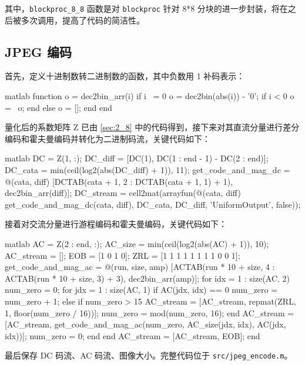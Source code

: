 \documentclass[a4paper]{article}  %
\begin{document}
其中，\texttt{blockproc\_8\_8} 函数是对 \texttt{blockproc} 针对 8*8 分块的进一步封装，将在之后被多次调用，提高了代码的简洁性。

\subsection{JPEG 编码}

首先，定义十进制数转二进制数的函数，其中负数用 1 补码表示：

\begin{codeblock}{matlab}
function o = dec2bin_arr(i)
    if i ~= 0
        o = dec2bin(abs(i)) - '0';
        if i < 0
            o = ~o;
        end
    else
        o = [];
    end
end
\end{codeblock}

量化后的系数矩阵 Z 已由 \ref{sec:2_8} 中的代码得到，接下来对其直流分量进行差分编码和霍夫曼编码并转化为二进制码流，关键代码如下：

\begin{codeblock}{matlab}
DC = Z(1, :);
DC_diff = [DC(1), DC(1 : end - 1) - DC(2 : end)];
DC_cata = min(ceil(log2(abs(DC_diff) + 1)), 11);
get_code_and_mag_dc = @(cata, diff) [DCTAB(cata + 1, 2 : DCTAB(cata + 1, 1) + 1), dec2bin_arr(diff)];
DC_stream = cell2mat(arrayfun(@(cata, diff) get_code_and_mag_dc(cata, diff), DC_cata, DC_diff, 'UniformOutput', false));
\end{codeblock}

接着对交流分量进行游程编码和霍夫曼编码，关键代码如下：

\begin{codeblock}{matlab}
AC = Z(2 : end, :);
AC_size = min(ceil(log2(abs(AC) + 1)), 10);
AC_stream = [];
EOB = [1 0 1 0];  %
ZRL = [1 1 1 1 1 1 1 1 0 0 1];  %
get_code_and_mag_ac = @(run, size, amp) [ACTAB(run * 10 + size, 4 : ACTAB(run * 10 + size, 3) + 3), dec2bin_arr(amp)];
for idx = 1 : size(AC, 2)
    num_zero = 0;
    for jdx = 1 : size(AC, 1)
        if AC(jdx, idx) == 0
            num_zero = num_zero + 1;
        else
            if num_zero > 15
                AC_stream = [AC_stream, repmat(ZRL, 1, floor(num_zero / 16))];
                num_zero = mod(num_zero, 16);
            end
            AC_stream = [AC_stream, get_code_and_mag_ac(num_zero, AC_size(jdx, idx), AC(jdx, idx))];
            num_zero = 0;
        end
    end
    AC_stream = [AC_stream, EOB];
end
\end{codeblock}

最后保存 DC 码流、AC 码流、图像大小。完整代码位于 \texttt{src/jpeg\_encode.m}。
\end{document}
